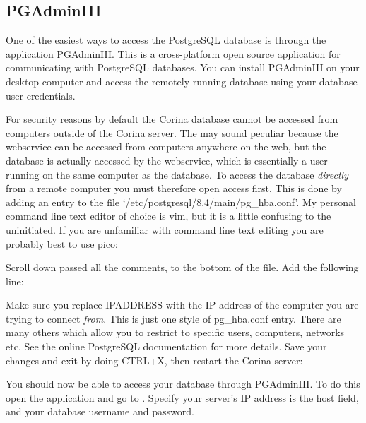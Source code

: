 
\subsection{PGAdminIII}
One of the easiest ways to access the PostgreSQL database is through the application PGAdminIII.  This is a cross-platform open source application for communicating with PostgreSQL databases.  You can install PGAdminIII on your desktop computer and access the remotely running database using your database user credentials.  

For security reasons by default the Corina database cannot be accessed from computers outside of the Corina server.  The may sound peculiar because the webservice can be accessed from computers anywhere on the web, but the database is actually accessed by the webservice, which is essentially a user running on the same computer as the database.  To access the database \emph{directly} from a remote computer you must therefore open access first.  This is done by adding an entry to the file `/etc/postgresql/8.4/main/pg\_hba.conf'.  My personal command line text editor of choice is vim, but it is a little confusing to the uninitiated.  If you are unfamiliar with command line text editing you are probably best to use pico:


Scroll down passed all the comments, to the bottom of the file.  Add the following line:


Make sure you replace IPADDRESS with the IP address of the computer you are trying to connect \emph{from}. This is just one style of pg\_hba.conf entry.  There are many others which allow you to restrict to specific users, computers, networks etc.  See the online PostgreSQL documentation for more details.  Save your changes and exit by doing CTRL+X, then restart the Corina server:


You should now be able to access your database through PGAdminIII. To do this open the application and go to .  Specify your server's IP address is the host field, and your database username and password.


